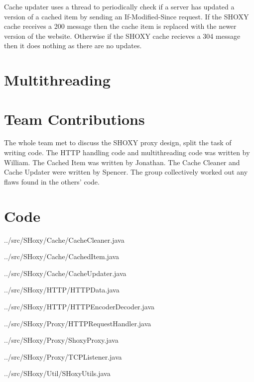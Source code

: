 \documentclass[11pt]{article}
\begin{document}
Cache updater uses a thread to periodically check if a server has updated a version of a cached item by sending an If-Modified-Since request. If the SHOXY cache receives a 200 message then the cache item is replaced with the newer version of the website. Otherwise if the SHOXY cache recieves a 304 message then it does nothing as there are no updates. 

\section{Multithreading}

\section{Team Contributions}
The whole team met to discuss the SHOXY proxy design, split the task of writing code. 
The HTTP handling code and multithreading code was written by William.
The Cached Item was written by Jonathan.
The Cache Cleaner and Cache Updater were  written by Spencer. 
The group collectively worked out any flaws found in the others' code.


\section{Code}

\begin{tiny}

\begin{lstinputlisting}[language=Java]{../src/SHoxy/Cache/CacheCleaner.java}
\end{lstinputlisting}
\begin{lstinputlisting}[language=Java]{../src/SHoxy/Cache/CachedItem.java}
\end{lstinputlisting}
\begin{lstinputlisting}[language=Java]{../src/SHoxy/Cache/CacheUpdater.java}
\end{lstinputlisting}
\begin{lstinputlisting}[language=Java]{../src/SHoxy/HTTP/HTTPData.java}
\end{lstinputlisting}
\begin{lstinputlisting}[language=Java]{../src/SHoxy/HTTP/HTTPEncoderDecoder.java}
\end{lstinputlisting}
\begin{lstinputlisting}[language=Java]{../src/SHoxy/Proxy/HTTPRequestHandler.java}
\end{lstinputlisting}
\begin{lstinputlisting}[language=Java]{../src/SHoxy/Proxy/ShoxyProxy.java}
\end{lstinputlisting}
\begin{lstinputlisting}[language=Java]{../src/SHoxy/Proxy/TCPListener.java}
\end{lstinputlisting}
\begin{lstinputlisting}[language=Java]{../src/SHoxy/Util/SHoxyUtils.java}
\end{lstinputlisting}

\end{tiny}
\end{document}

